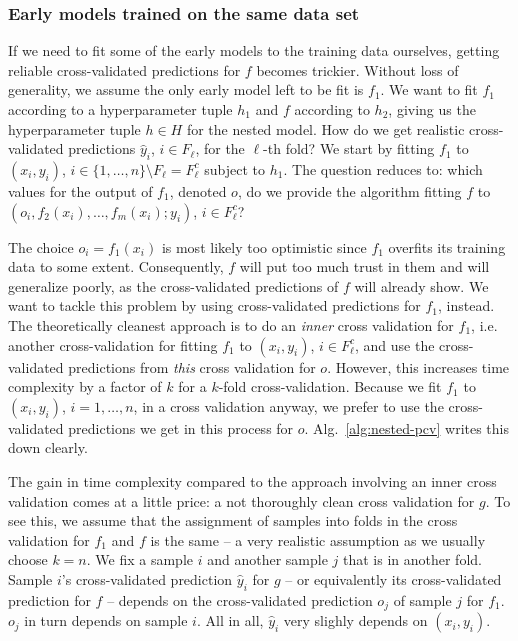 \subsubsection{Early models trained on the same data set}
If we need to fit some of the early models to the training data ourselves, getting reliable 
cross-validated predictions
for $f$ becomes trickier. Without loss of generality, we assume the only early model left to be fit 
is $f_1$. We want to fit $f_1$ according to a hyperparameter tuple $h_1$ and $f$ according to $h_2$, 
giving us the hyperparameter tuple $h \in H$ for the nested model. How do 
we get realistic cross-validated predictions $\hat{y}_i$, $i \in F_\ell$, for the $\ell$-th fold? 
We start by fitting $f_1$ to $(x_i, y_i)$, $i \in \{ 1, \ldots, n \} \setminus F_\ell = F_\ell^c$ 
subject to $h_1$.
The question reduces to: which values for the output of $f_1$, denoted $o$, do we provide the 
algorithm fitting $f$ to $(o_i, f_2(x_i), \dots, f_m(x_i); y_i)$, $i \in F_\ell^c$?

The choice $o_i = f_1(x_i)$ is most likely too optimistic since $f_1$ overfits its training 
data to some extent. Consequently, $f$ will put too much trust in them and will generalize poorly, 
as the cross-validated predictions of $f$ will already show. We want to tackle this problem by 
using cross-validated predictions for $f_1$, instead. The theoretically cleanest approach 
is to do an \textit{inner} cross validation for $f_1$, i.e. another cross-validation for fitting 
$f_1$ to $(x_i, y_i)$, $i \in F_\ell^c$, and use the cross-validated predictions from \textit{this} 
cross validation for $o$. However, this increases time complexity by a factor of $k$ for a $k$-fold 
cross-validation. Because we fit $f_1$ to $(x_i, y_i)$, $i = 1, \ldots, n$, in a cross validation 
anyway, we prefer to use the cross-validated predictions we get in this process for $o$. 
Alg.\ \ref{alg:nested-pcv} writes this down clearly.



The gain in time complexity compared to the approach involving an inner cross validation comes at a 
little price: a not thoroughly clean cross validation for $g$. To see this, we assume that the 
assignment of samples into folds in the cross validation for $f_1$ and $f$ is the same -- a very 
realistic assumption as we 
usually choose $k = n$. We fix a sample $i$ and another sample $j$ that is in another fold. 
Sample $i$'s cross-validated prediction $\hat{y}_i$ for $g$ -- or equivalently its cross-validated 
prediction for $f$ -- depends on the cross-validated 
prediction $o_j$ of sample $j$ for $f_1$. $o_j$ in turn depends on sample 
$i$. All in all, $\hat{y}_i$ very slighly depends on $(x_i, y_i)$.

